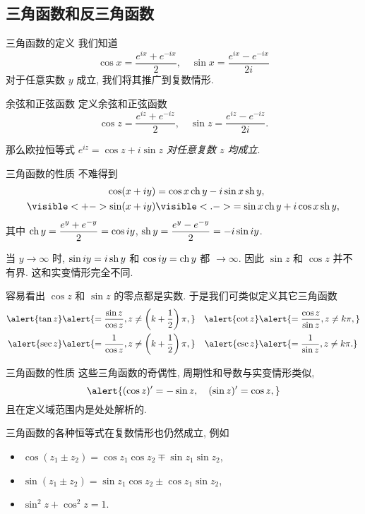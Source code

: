 \subsection{三角函数和反三角函数}

\begin{frame}{三角函数的定义}
	\onslide<+->
	我们知道
	\[\cos x=\frac{e^{ix}+e^{-ix}}2,\quad
	\sin x=\frac{e^{ix}-e^{-ix}}{2i}\]
	对于任意实数 $y$ 成立,
	\onslide<+->
	我们将其推广到复数情形.
	\onslide<+->

	\begin{alertblock}{余弦和正弦函数}
		定义余弦和正弦函数
		\[\displaystyle\cos z=\frac{e^{iz}+e^{-iz}}2,\quad
		\sin z=\frac{e^{iz}-e^{-iz}}{2i}.\]
	\end{alertblock}

	\onslide<+->
	那么欧拉恒等式 \emph{$e^{iz}=\cos z+i\sin z$ 对任意复数 $z$ 均成立}.
\end{frame}


\begin{frame}{三角函数的性质}
	\onslide<+->
	不难得到
	\begin{align*}
		\cos(x+iy)&=\cos x \ch y-i\sin x\sh y,\\
		\visible<+->{\sin(x+iy)}&
		\visible<.->{=\sin x\ch y+i\cos x\sh y,}
	\end{align*}
	\onslide<+->
	其中 $\operatorname{ch} y=\dfrac{e^y+e^{-y}}2=\cos{iy}$, $\operatorname{sh} y=\dfrac{e^y-e^{-y}}2=-i\sin{iy}$.

	\onslide<+->
	当 $y\to\infty$ 时, $\sin iy=i\operatorname{sh} y$ 和 $\cos iy=\operatorname{ch} y$ 都 $\to\infty$.
	\onslide<+->
	因此 \alert{$\sin z$ 和 $\cos z$ 并不有界}. 
	\onslide<+->
	这和实变情形完全不同.

	\onslide<+->
	容易看出 $\cos z$ 和 $\sin z$ 的零点都是实数.
	\onslide<+->
	于是我们可类似定义其它三角函数
	\begin{align*}
		\alert{\tan z}&
		\alert{=\frac{\sin z}{\cos z},z\neq\left(k+\half\right)\pi,}&
		\alert{\cot z}&
		\alert{=\frac{\cos z}{\sin z},z\neq k\pi,}\\
		\alert{\sec z}&
		\alert{=\frac{1}{\cos z},z\neq\left(k+\half\right)\pi,}&
		\alert{\csc z}&
		\alert{=\frac{1}{\sin z},z\neq k\pi.}
	\end{align*}
\end{frame}


\begin{frame}{三角函数的性质}
	\onslide<+->
	这些三角函数的奇偶性, 周期性和导数与实变情形类似,
	\[\alert{(\cos z)'=-\sin z,\quad
	(\sin z)'=\cos z,}\]
	\onslide<+->
	且在定义域范围内是处处解析的.

	\onslide<+->
	三角函数的各种恒等式在复数情形也仍然成立,
	\onslide<+->
	例如
	\begin{itemize}
		\item $\cos(z_1\pm z_2)=\cos z_1 \cos z_2\mp \sin z_1 \sin z_2$,
		\item $\sin(z_1\pm z_2)=\sin z_1 \cos z_2\pm\cos z_1 \sin z_2$,
		\item $\sin^2z+\cos^2z=1$.
	\end{itemize}
\end{frame}


